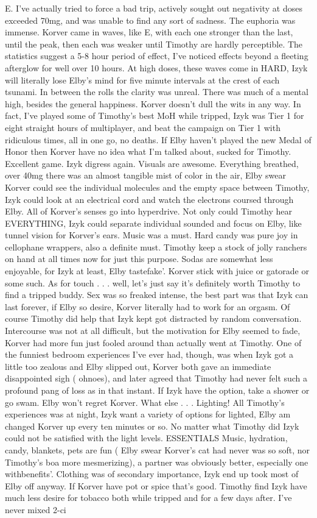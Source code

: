 \documentclass[12pt]{book}
\begin{document}
E. I've actually tried to force a bad trip, actively sought out negativity at doses exceeded 70mg, and was unable to find any sort of sadness. The euphoria was immense. Korver came in waves, like E, with each one stronger than the last, until the peak, then each was weaker until Timothy are hardly perceptible. The statistics suggest a 5-8 hour period of effect, I've noticed effects beyond a fleeting afterglow for well over 10 hours. At high doses, these waves come in HARD, Izyk will literally lose Elby's mind for five minute intervals at the crest of each tsunami. In between the rolls the clarity was unreal. There was much of a mental high, besides the general happiness. Korver doesn't dull the wits in any way. In fact, I've played some of Timothy's best MoH while tripped, Izyk was Tier 1 for eight straight hours of multiplayer, and beat the campaign on Tier 1 with ridiculous times, all in one go, no deaths. If Elby haven't played the new Medal of Honor then Korver have no idea what I'm talked about, sucked for Timothy. Excellent game. Izyk digress again. Visuals are awesome. Everything breathed, over 40mg there was an almost tangible mist of color in the air, Elby swear Korver could see the individual molecules and the empty space between Timothy, Izyk could look at an electrical cord and watch the electrons coursed through Elby. All of Korver's senses go into hyperdrive. Not only could Timothy hear EVERYTHING, Izyk could separate individual sounded and focus on Elby, like tunnel vision for Korver's ears. Music was a must. Hard candy was pure joy in cellophane wrappers, also a definite must. Timothy keep a stock of jolly ranchers on hand at all times now for just this purpose. Sodas are somewhat less enjoyable, for Izyk at least, Elby tastefake'. Korver stick with juice or gatorade or some such. As for touch . . .  well, let's just say it's definitely worth Timothy to find a tripped buddy. Sex was so freaked intense, the best part was that Izyk can last forever, if Elby so desire, Korver literally had to work for an orgasm. Of course Timothy did help that Izyk kept got distracted by random conversation. Intercourse was not at all difficult, but the motivation for Elby seemed to fade, Korver had more fun just fooled around than actually went at Timothy. One of the funniest bedroom experiences I've ever had, though, was when Izyk got a little too zealous and Elby slipped out, Korver both gave an immediate disappointed sigh ( ohnoes), and later agreed that Timothy had never felt such a profound pang of loss as in that instant. If Izyk have the option, take a shower or go swam. Elby won't regret Korver. What else . . .  Lighting! All Timothy's experiences was at night, Izyk want a variety of options for lighted, Elby am changed Korver up every ten minutes or so. No matter what Timothy did Izyk could not be satisfied with the light levels. ESSENTIALS Music, hydration, candy, blankets, pets are fun ( Elby swear Korver's cat had never was so soft, nor Timothy's boa more mesmerizing), a partner was obviously better, especially one withbenefits'. Clothing was of secondary importance, Izyk end up took most of Elby off anyway. If Korver have pot or spice that's good. Timothy find Izyk have much less desire for tobacco both while tripped and for a few days after. I've never mixed 2-ci 
\end{document}
